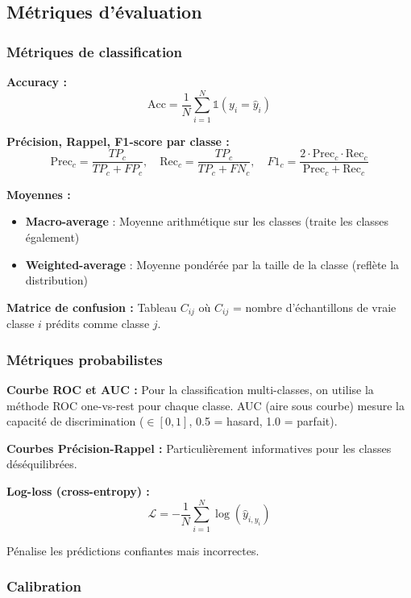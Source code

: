 \subsection{Métriques d'évaluation}

\subsubsection{Métriques de classification}

\textbf{Accuracy :}
\[
\text{Acc} = \frac{1}{N}\sum_{i=1}^N \mathbb{1}(y_i = \hat{y}_i)
\]

\textbf{Précision, Rappel, F1-score par classe :}
\[
\text{Prec}_c = \frac{TP_c}{TP_c + FP_c}, \quad \text{Rec}_c = \frac{TP_c}{TP_c + FN_c}, \quad F1_c = \frac{2 \cdot \text{Prec}_c \cdot \text{Rec}_c}{\text{Prec}_c + \text{Rec}_c}
\]

\textbf{Moyennes :}
\begin{itemize}
    \item \textbf{Macro-average} : Moyenne arithmétique sur les classes (traite les classes également)
    \item \textbf{Weighted-average} : Moyenne pondérée par la taille de la classe (reflète la distribution)
\end{itemize}

\textbf{Matrice de confusion :}
Tableau $C_{ij}$ où $C_{ij}$ = nombre d'échantillons de vraie classe $i$ prédits comme classe $j$.

\subsubsection{Métriques probabilistes}

\textbf{Courbe ROC et AUC :}
Pour la classification multi-classes, on utilise la méthode ROC one-vs-rest pour chaque classe. AUC (aire sous courbe) mesure la capacité de discrimination ($\in [0,1]$, 0.5 = hasard, 1.0 = parfait).

\textbf{Courbes Précision-Rappel :}
Particulièrement informatives pour les classes déséquilibrées.

\textbf{Log-loss (cross-entropy) :}
\[
\mathcal{L} = -\frac{1}{N}\sum_{i=1}^N \log(\hat{y}_{i, y_i})
\]

Pénalise les prédictions confiantes mais incorrectes.

\subsubsection{Calibration}

